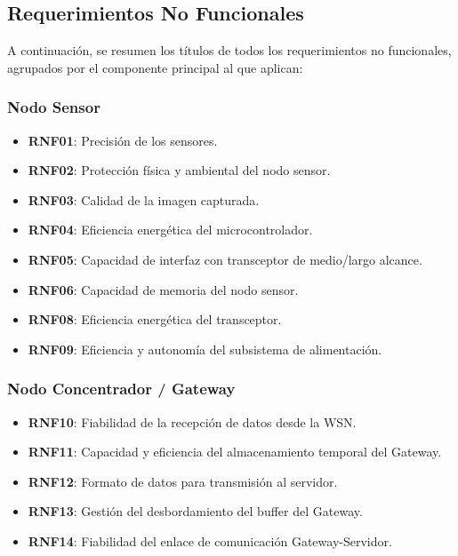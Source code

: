 \subsection{Requerimientos No Funcionales}
\label{subsec:rnf_summary} %

A continuación, se resumen los títulos de todos los requerimientos no funcionales, agrupados por el componente principal al que aplican:

\subsubsection*{Nodo Sensor}
\begin{itemize}
    \item \textbf{RNF01}: Precisión de los sensores.
    \item \textbf{RNF02}: Protección física y ambiental del nodo sensor.
    \item \textbf{RNF03}: Calidad de la imagen capturada.
    \item \textbf{RNF04}: Eficiencia energética del microcontrolador.
    \item \textbf{RNF05}: Capacidad de interfaz con transceptor de medio/largo alcance.
    \item \textbf{RNF06}: Capacidad de memoria del nodo sensor.
    \item \textbf{RNF08}: Eficiencia energética del transceptor.
    \item \textbf{RNF09}: Eficiencia y autonomía del subsistema de alimentación.
\end{itemize}

\subsubsection*{Nodo Concentrador / Gateway}
\begin{itemize}
    \item \textbf{RNF10}: Fiabilidad de la recepción de datos desde la WSN.
    \item \textbf{RNF11}: Capacidad y eficiencia del almacenamiento temporal del Gateway.
    \item \textbf{RNF12}: Formato de datos para transmisión al servidor.
    \item \textbf{RNF13}: Gestión del desbordamiento del buffer del Gateway.
    \item \textbf{RNF14}: Fiabilidad del enlace de comunicación Gateway-Servidor.
\end{itemize}

